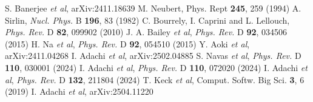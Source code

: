 \documentclass{moriond}
\def\Journal#1#2#3#4{{#1} {\bf #2}, #3 (#4)}
\def\NPB{{\em Nucl. Phys.} B}
\def\PLB{{\em Phys. Lett.}  B}
\def\PRD{{\em Phys. Rev.} D}
\begin{document}
\begin{thebibliography}{99}

S. Banerjee {\it et al}, arXiv:2411.18639
M. Neubert, \Journal{Phys. Rept}{245}{259}{1994}
A. Sirlin, \Journal{\NPB}{196}{83}{1982}
C. Bourrely, I. Caprini and L. Lellouch, \Journal{\PRD}{82}{099902}{2010}
J. A. Bailey {\it et al}, \Journal{\PRD}{92}{034506}{2015}
H. Na {\it et al}, \Journal{\PRD}{92}{054510}{2015}
Y. Aoki {\it et al}, arXiv:2411.04268
I. Adachi {\it et al}, arXiv:2502.04885
S. Navas {\it et al}, \Journal{\PRD}{110}{030001}{2024}
I. Adachi {\it et al}, \Journal{\PRD}{110}{072020}{2024}
I. Adachi {\it et al}, \Journal{\PRD}{132}{211804}{2024}
T. Keck {\it et al}, \Journal{Comput. Softw. Big Sci.}{3}{6}{2019}
I. Adachi {\it et al}, arXiv:2504.11220


\end{thebibliography}
\end{document}
